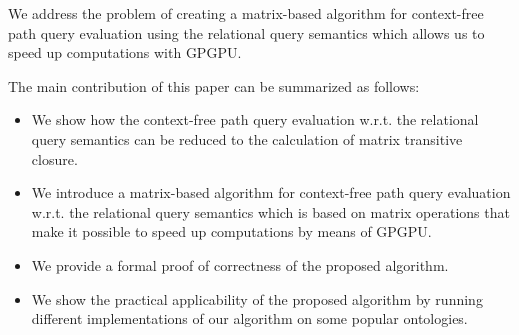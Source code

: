 We address the problem of creating a matrix-based algorithm for context-free path query evaluation using the relational query semantics which allows us to speed up computations with GPGPU.

The main contribution of this paper can be summarized as follows:
\begin{itemize}
	\item We show how the context-free path query evaluation w.r.t. the relational query semantics can be reduced to the calculation of matrix transitive closure.
	\item We introduce a matrix-based algorithm for context-free path query evaluation w.r.t. the relational query semantics which is based on matrix operations that make it possible to speed up computations by means of GPGPU.
	\item We provide a formal proof of correctness of the proposed algorithm.
	\item We show the practical applicability of the proposed algorithm by running different implementations of our algorithm on some popular ontologies.
\end{itemize}
